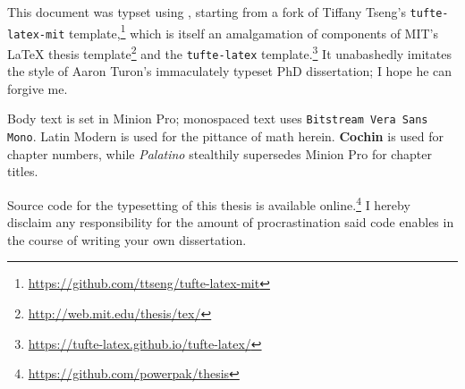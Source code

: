 
\setcounter{biburlnumpenalty}{100}
\setcounter{biburlucpenalty}{100}
\setcounter{biburllcpenalty}{100}


\printbibliography[heading=bibintoc]


\clearpage

\vspace*{\fill}

\noindent{}

\vspace{1em}

\noindent{}This document was typset using \XeTeX, starting from a fork of Tiffany Tseng's \texttt{tufte-latex-mit} template,\footnote{\url{https://github.com/ttseng/tufte-latex-mit}} which is itself an amalgamation of components of MIT's \LaTeX{} thesis template\footnote{\url{http://web.mit.edu/thesis/tex/}} and the \texttt{tufte-latex} template.\footnote{\url{https://tufte-latex.github.io/tufte-latex/}} It unabashedly imitates the style of Aaron Turon's immaculately typeset PhD dissertation;\autocite{Turon2013} I hope he can forgive me.

Body text is set in Minion Pro; monospaced text uses \texttt{Bitstream Vera Sans Mono}. {\selectfont{}Latin Modern} is used for the pittance of math herein. {\chapterNumberNormalSize\textbf{Cochin}} is used for chapter numbers, while {\chapterTitle\itshape Palatino} stealthily supersedes Minion Pro for chapter titles.

Source code for the typesetting of this thesis is available online.\footnote{\url{https://github.com/powerpak/thesis}} I hereby disclaim any responsibility for the amount of procrastination said code enables in the course of writing your own dissertation.